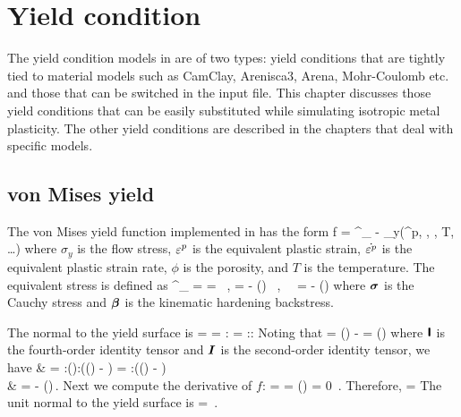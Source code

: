 \chapter{Yield condition}

The yield condition models in \Vaango are of two types: yield conditions that are
tightly tied to material models such as CamClay, Arenisca3, Arena, Mohr-Coulomb 
etc. and those that can be switched in the input file.  This chapter discusses
those yield conditions that can be easily substituted while simulating isotropic
metal plasticity.  The other yield conditions are described in the chapters that
deal with specific models.

\section{von Mises yield}
  The von Mises yield function implemented in \Vaango has the form
  \Beq
    f = \sigma^\xi_{\Teq} - \sigma_y(\Veps^p, , \phi, T, \dots)
  \Eeq 
  where $\sigma_y$ is the flow stress, $\varepsilon^p$ is the equivalent plastic strain,
  $\dot{\varepsilon^p}$ is the equivalent plastic strain rate, $\phi$ is the
  porosity, and $T$ is the temperature.  The equivalent stress is defined as
  \Beq \label{eq:equiv_stress}
    \sigma^\xi_{\Teq} =  =  ~,\quad
    \Bxi =  \BsT - \Dev(\Bbeta) ~,~~ \BsT = \Bsig - \Third \Tr(\Bsig)\BI
  \Eeq
  where $\boldsymbol{\sigma}$ is the Cauchy stress and $\boldsymbol{\beta}$ is the kinematic hardening backstress.

  The normal to the yield surface is 
  \Beq
    \BN = 
        = :\Partial{\Bxi}{\Bsig}
        = :\Partial{\Bxi}{\BsT}:\Partial{\BsT}{\Bsig}
  \Eeq
  Noting that
  \Beq
    \Partial{\BsT}{\Bsig} = \Tsym(\SfI) - \Third \BI\otimes\BI
    \quad \Tand \quad
    \Partial{\Bxi}{\BsT} = \Tsym(\SfI)
  \Eeq
  where $\boldsymbol{\mathsf{I}}$ is the fourth-order identity tensor and $\boldsymbol{I}$ is the second-order
  identity tensor, we have
  \Beq \label{eq:df_dxi}
    \Bal
      \BN & = :\Tsym(\SfI):(\Tsym(\SfI) - \Third \BI\otimes\BI)
            = :(\Tsym(\SfI) - \Third \BI\otimes\BI) \\
          & =  - \Third \Tr\left(\right)\BI \,.
    \Eal
  \Eeq
  Next we compute the derivative of $f$:
  \Beq
     =  \Partial{\sigma^\xi_\Teq}{\Bxi}
     =  \frac{\Bxi}{\sqrt{\Bxi:\Bxi}} 
    \quad \implies \quad
    \Tr\left(\right) = 0 \,.
  \Eeq
  Therefore,
  \Beq
    \BN =  \frac{\Bxi}{\Norm{\Bxi}{}}
  \Eeq
  The unit normal to the yield surface is
  \Beq
    \hat{\BN} = \frac{\Bxi}{\Norm{\Bxi}{}} \,.
  \Eeq
  
